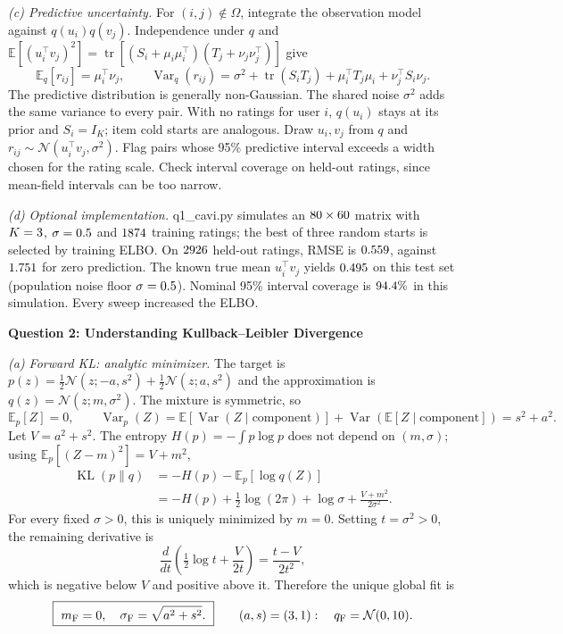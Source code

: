 \documentclass[12pt]{article}
\newcommand{\E}{\mathbb{E}}
\newcommand{\Var}{\operatorname{Var}}
\newcommand{\tr}{\operatorname{tr}}
\newcommand{\KL}{\operatorname{KL}}
\newcommand{\N}{\mathcal{N}}
\begin{document}
\textit{(c) Predictive uncertainty.}
For $(i,j)\notin\Omega$, integrate the observation model against $q(u_i)q(v_j)$.
Independence under $q$ and $\E[(u_i^\top v_j)^2]=\tr[(S_i+\mu_i\mu_i^\top)(T_j+\nu_j\nu_j^\top)]$ give
\[
\E_q[r_{ij}]=\mu_i^\top\nu_j,\qquad
\Var_q(r_{ij})=\sigma^2+\tr(S_iT_j)+\mu_i^\top T_j\mu_i+\nu_j^\top S_i\nu_j.
\]
The predictive distribution is generally non-Gaussian. The shared noise $\sigma^2$
adds the same variance to every pair. With no ratings for user $i$, $q(u_i)$ stays at
its prior and $S_i=I_K$; item cold starts are analogous. Draw $u_i,v_j$ from $q$ and
$r_{ij}\sim\N(u_i^\top v_j,\sigma^2)$. Flag pairs whose 95\% predictive interval
exceeds a width chosen for the rating scale. Check interval coverage on held-out
ratings, since mean-field intervals can be too narrow.

\textit{(d) Optional implementation.}
\textnormal{q1\_cavi.py} simulates an $80\times60$ matrix with
$K=3$, $\sigma=0.5$ and $1874$ training ratings; the best of three
random starts is selected by training ELBO. On $2926$ held-out ratings, RMSE is
$0.559$, against $1.751$ for zero prediction. The known true mean
$u_i^\top v_j$ yields $0.495$ on this test set (population noise floor $\sigma=0.5$). Nominal 95\% interval coverage is
$94.4\%$ in this simulation. Every sweep increased the ELBO.

\clearpage
\textbf{Question 2: Understanding Kullback--Leibler Divergence}

\textit{(a) Forward KL: analytic minimizer.}
The target is $p(z)=\tfrac12\N(z;-a,s^2)+\tfrac12\N(z;a,s^2)$ and the approximation
is $q(z)=\N(z;m,\sigma^2)$. The mixture is symmetric, so
\[
\E_p[Z]=0,\qquad
\Var_p(Z)=\E[\Var(Z\mid\text{component})]
  +\Var(\E[Z\mid\text{component}])=s^2+a^2.
\]
Let $V=a^2+s^2$. The entropy $H(p)=-\int p\log p$ does not depend on $(m,\sigma)$;
using $\E_p[(Z-m)^2]=V+m^2$,
\[
\begin{aligned}
\KL(p\|q)
&=-H(p)-\E_p[\log q(Z)]\\
&=-H(p)+\tfrac12\log(2\pi)+\log\sigma+\frac{V+m^2}{2\sigma^2}.
\end{aligned}
\]
For every fixed $\sigma>0$, this is uniquely minimized by $m=0$. Setting
$t=\sigma^2>0$, the remaining derivative is
\[
\frac{d}{dt}\left(\tfrac12\log t+\frac{V}{2t}\right)
=\frac{t-V}{2t^2},
\]
which is negative below $V$ and positive above it. Therefore the unique global fit is
\[
\boxed{\ m_{\rm F}=0,\quad \sigma_{\rm F}=\sqrt{a^2+s^2}.\ }
\qquad (a,s)=(3,1):\quad q_{\rm F}=\N(0,10).
\]
\end{document}
